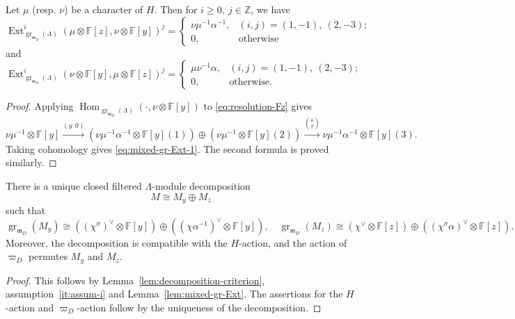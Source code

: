 \documentclass[11pt,a4paper]{article} %
\def\FF{\mathbb{F}}
\def\Ext{\operatorname{Ext}} %
\def\gr{\operatorname{gr}}
\def\Hom{\operatorname{Hom}}
\begin{document}
\begin{lemma}\label{lem:mixed-gr-Ext}
    Let $\mu$ (resp. $\nu$) be a character of $H$. Then for $i\ge0,~j\in\mathbb{Z}$, we have
    \begin{equation}\label{eq:mixed-gr-Ext-1}
         \Ext_{\gr_{\mathfrak{m}_D}(\Lambda)}^i(\mu\otimes\FF[z],\nu\otimes\FF[y])^j=
         \begin{cases}
             \nu\mu^{-1}\alpha^{-1},&(i,j)=(1,-1),~(2,-3);\\
             0,&\text{otherwise}            
         \end{cases}
    \end{equation}
and
\begin{equation}\label{eq:mixed-gr-Ext-2}
         \Ext_{\gr_{\mathfrak{m}_D}(\Lambda)}^i(\nu\otimes\FF[y],\mu\otimes\FF[z])^j=
         \begin{cases}
             \mu\nu^{-1}\alpha,&(i,j)=(1,-1),~(2,-3);\\
             0,&\text{otherwise}.            
         \end{cases}
    \end{equation}
\end{lemma}
\begin{proof}
Applying $\Hom_{\gr_{\mathfrak{m}_D}(\Lambda)}(\cdot,\nu\otimes\FF[y])$ to \eqref{eq:resolution-Fz} gives
\[
\nu\mu^{-1}\otimes\FF[y]\xrightarrow{(y\ \ 0)}
\left(\nu\mu^{-1}\alpha^{-1}\otimes\FF[y](1)\right)\oplus\left(\nu\mu^{-1}\otimes\FF[y](2)\right)
\xrightarrow{\binom{0}{y}}\nu\mu^{-1}\alpha^{-1}\otimes\FF[y](3).
\]
Taking cohomology gives \eqref{eq:mixed-gr-Ext-1}. The second formula is proved similarly.
\end{proof}

\begin{proposition}\label{prop:O_D-decomposition}
    There is a unique closed filtered $\Lambda$-module decomposition 
    \[
    M\cong M_y\oplus M_z
    \]
    such that  
    \[   
    \gr_{\mathfrak{m}_D}(M_y)\cong\left((\chi^\sigma)^\vee\otimes\FF[y]\right)\oplus\left((\chi\alpha^{-1})^\vee\otimes\FF[y]\right),\quad \gr_{\mathfrak{m}_D}(M_z)\cong(\chi^\vee\otimes\FF[z])\oplus\left((\chi^\sigma\alpha)^\vee\otimes\FF[z]\right).
    \]
    Moreover, the decomposition is compatible with the $H$-action, and the action of $\varpi_D$ permutes $M_y$ and $M_z$.
\end{proposition}
\begin{proof}
    This follows by Lemma~\ref{lem:decomposition-criterion}, assumption~\ref{it:assum-i} and Lemma~\ref{lem:mixed-gr-Ext}. The assertions for the $H$-action and $\varpi_D$-action follow by the uniqueness of the decomposition.
\end{proof}
\end{document}
